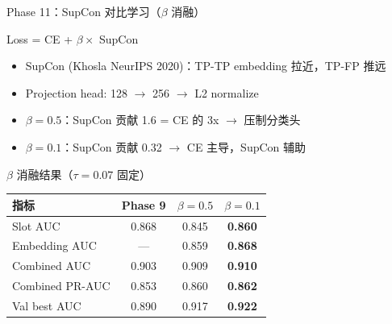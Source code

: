 \documentclass[aspectratio=169, 10pt]{beamer}
\begin{document}
\begin{frame}{Phase 11：SupCon 对比学习（$\beta$ 消融）}
  \begin{block}{Loss = CE + $\beta \times$ SupCon}
    \begin{itemize}
      \item SupCon (Khosla NeurIPS 2020)：TP-TP embedding 拉近，TP-FP 推远
      \item Projection head: 128 $\to$ 256 $\to$ L2 normalize
      \item $\beta=0.5$：SupCon 贡献 1.6 = CE 的 3x $\to$ 压制分类头
      \item $\beta=0.1$：SupCon 贡献 0.32 $\to$ CE 主导，SupCon 辅助
    \end{itemize}
  \end{block}
  \vspace{0em}
  \begin{alertblock}{$\beta$ 消融结果（$\tau=0.07$ 固定）}
    \begin{tabular}{lccc}
      \toprule
      \textbf{指标} & \textbf{Phase 9} & \textbf{$\beta=0.5$} & \textbf{$\beta=0.1$} \\
      \midrule
      Slot AUC & 0.868 & 0.845 & \textbf{0.860} \\
      Embedding AUC & --- & 0.859 & \textbf{0.868} \\
      Combined AUC & 0.903 & 0.909 & \textbf{0.910} \\
      Combined PR-AUC & 0.853 & 0.860 & \textbf{0.862} \\
      Val best AUC & 0.890 & 0.917 & \textbf{0.922} \\
      \bottomrule
    \end{tabular}
  \end{alertblock}
\end{frame}
\end{document}
